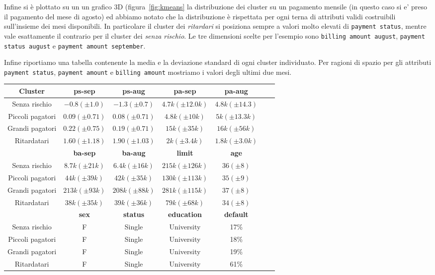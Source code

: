 Infine si \`e plottato su un un grafico 3D (figura~\ref{fig:kmeans}
la distribuzione dei cluster su un pagamento mensile (in questo 
caso si e' preso il pagamento del mese di agosto) ed abbiamo 
notato che la distribuzione \`e rispettata per ogni terna di attributi
validi costruibili sull'insieme dei mesi disponibili.
In particolare il cluster dei \textit{ritardari} si posiziona sempre
a valori molto elevati di \texttt{payment status}, mentre vale
esattamente il contrario per il cluster dei \textit{senza rischio}.
Le tre
dimensioni scelte per l'esempio sono \texttt{billing amount august},
\texttt{payment status august} e \texttt{payment amount september}.

Infine riportiamo una tabella contenente la media e la deviazione 
standard di ogni cluster individuato. Per ragioni di spazio per 
gli attributi \texttt{payment status}, \texttt{payment amount}
e \texttt{billing amount} mostriamo i valori degli ultimi due mesi.

\begin{center}
	
\begin{tabular}{c|c|c|c|c|c|c}
	\hline
	\textbf{Cluster} & \textbf{ps-sep} 
	& \textbf{ps-aug} & \textbf{pa-sep} 
	& \textbf{pa-aug}\\
	\hline
	Senza rischio & 
	$-0.8 (\pm 1.0)$ & 
	$-1.3 (\pm 0.7)$ &
	$4.7k (\pm 12.0k)$ &
	$4.8k (\pm 14.3)$\\
	\hline
	Piccoli pagatori & 
	$0.09 (\pm 0.71)$ & 
	$0.08 (\pm 0.71)$ &
	$4.8k (\pm 10k)$ &
	$5k (\pm 13.3k)$\\
	\hline
	Grandi pagatori & 
	$0.22 (\pm 0.75)$ & 
	$0.19 (\pm 0.71)$ &
	$15k (\pm 35k)$ &
	$16k (\pm 56k)$\\
	\hline
	Ritardatari & 
	$1.60 (\pm 1.18)$ & 
	$1.90 (\pm 1.03)$ &
	$2k (\pm 3.4k)$ &
	$1.8k (\pm 3.0k)$\\
	\hline
	& 
	\textbf{ba-sep} & 
	\textbf{ba-aug} & 
	\textbf{limit} & 
	\textbf{age} &\\
	\hline
	Senza rischio & 
	$8.7k (\pm 21k)$ &
	$6.4k (\pm 16k)$ &
	$215k (\pm 126k)$ &
	$36 (\pm 8)$\\
	\hline
	Piccoli pagatori &
	$44k (\pm 39k)$ &
	$42k (\pm 35k)$ &
	$130k (\pm 113k)$ &
	$35 (\pm 9)$\\
	\hline
	Grandi pagatori &
	$213k (\pm 93k)$ &
	$208k (\pm 88k)$ &
	$281k (\pm 115k)$ &
	$37 (\pm 8)$\\
	\hline
	Ritardatari &
	$38k (\pm 35k)$ &
	$39k (\pm 36k)$ &
	$79k (\pm 68k)$ &
	$34 (\pm 8)$\\
	\hline
	& 
	\textbf{sex} & 
	\textbf{status} & 
	\textbf{education} & 
	\textbf{default}\\
	\hline
	Senza rischio & 
	F &
	Single &
	University&
	17\%\\
	\hline
	Piccoli pagatori & 
	F &
	Single &
	University&
	18\%\\
	\hline
	Grandi pagatori & 
	F &
	Single &
	University&
	19\%\\
	\hline
	Ritardatari & 
	F &
	Single &
	University&
	61\%\\
	\hline
\end{tabular}

\end{center}

